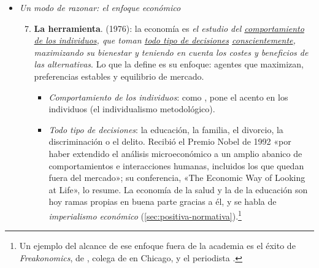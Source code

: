 \documentclass[11pt]{article}
\begin{document}
\begin{itemize}
\begin{enumerate}
  \item \textbf{El aprovechamiento de los recursos}. La crítica a : la economía no es solo la gestión de recursos escasos, porque también estudia \emph{el \uline{aprovechamiento} de los recursos \uline{aunque no sean escasos}}.
    \begin{itemize}
    \item \emph{Aprovechamiento}: unos recursos pueden estar mal asignados o sin usar; el problema no es solo repartirlos, sino emplearlos bien.
    \item \emph{Aunque no sean escasos}: en una depresión sobran trabajadores y máquinas ociosos, y la pregunta es por qué no se usan, que es la de la macroeconomía de  (\ref{sec:ramas}).
    \end{itemize}
  \end{enumerate}
\item \emph{Un modo de razonar: el enfoque económico}
  \begin{enumerate}\setcounter{enumi}{6}
  \item \textbf{La herramienta}.  (1976): la economía es \emph{el estudio del \uline{comportamiento de los individuos}, que toman \uline{todo tipo de decisiones} \uline{conscientemente}, maximizando su bienestar y teniendo en cuenta los costes y beneficios de las alternativas}. Lo que la define es su enfoque: agentes que maximizan, preferencias estables y equilibrio de mercado\nocite{Becker1976Economic}.
    \begin{itemize}
    \item \emph{Comportamiento de los individuos}: como , pone el acento en los individuos (el individualismo metodológico).
    \item \emph{Todo tipo de decisiones}: la educación, la familia, el divorcio, la discriminación o el delito. Recibió el Premio Nobel de 1992 «por haber extendido el análisis microeconómico a un amplio abanico de comportamientos e interacciones humanas, incluidos los que quedan fuera del mercado»\nocite{Nobel1992Becker}; su conferencia, «The Economic Way of Looking at Life», lo resume\nocite{Becker1993Economic}. La economía de la salud y la de la educación son hoy ramas propias en buena parte gracias a él, y se habla de \emph{imperialismo económico} (\ref{sec:positiva-normativa}).\footnote{Un ejemplo del alcance de ese enfoque fuera de la academia es el éxito de \emph{Freakonomics}\nocite{Levitt2005Freakonomics}, de , colega de  en Chicago, y el periodista .}

\end{itemize}
\end{enumerate}
\end{itemize}
\end{document}
